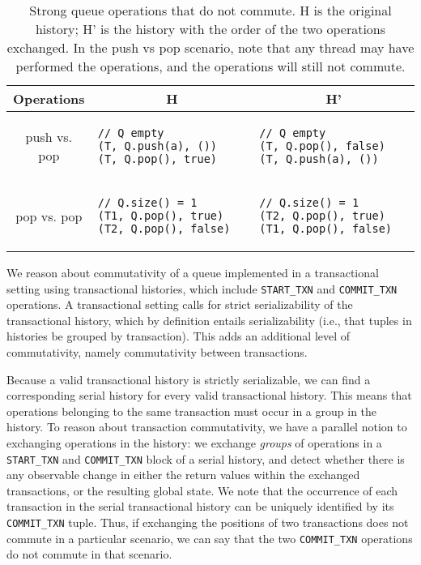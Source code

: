\begin{table}[t]
    \singlespace
    \centering
    \begin{tabular}{|c|l|l|}
        \hline
        Operations & \multicolumn{1}{c}{H} & \multicolumn{1}{|c|}{H'} \\
        \hline
    
        push vs. pop &
\begin{lstlisting}
// Q empty
(T, Q.push(a), ())                       
(T, Q.pop(), true)
\end{lstlisting} &
\begin{lstlisting}
// Q empty
(T, Q.pop(), false)
(T, Q.push(a), ())                       
\end{lstlisting}\\
\hline

    pop vs. pop &
\begin{lstlisting}
// Q.size() = 1
(T1, Q.pop(), true)
(T2, Q.pop(), false)                       
\end{lstlisting} &
\begin{lstlisting}
// Q.size() = 1
(T2, Q.pop(), true)
(T1, Q.pop(), false)                       
\end{lstlisting}\\
    \hline

    \end{tabular}
    \caption[Strong queue operations that do not commute]{Strong queue operations that do not commute. H is the original history; H' is the history with the order of the two operations exchanged. In the push vs pop scenario, note that any thread may have performed the operations, and the operations will still not commute.}
    \label{tab:strongq_commute}
    \end{table}

We reason about commutativity of a queue implemented in a transactional setting using transactional histories, which include \texttt{START\_TXN} and \texttt{COMMIT\_TXN} operations. A transactional setting calls for strict serializability of the transactional history, which by definition entails serializability (i.e., that tuples in histories be grouped by transaction). This adds an additional level of commutativity, namely commutativity between transactions.

Because a valid transactional history is strictly serializable, we can find a corresponding serial history for every valid transactional history. This means that operations belonging to the same transaction must occur in a group in the history. To reason about transaction commutativity, we have a parallel notion to exchanging operations in the history: we exchange \emph{groups} of operations in a \texttt{START\_TXN} and \texttt{COMMIT\_TXN} block of a serial history, and detect whether there is any observable change in either the return values within the exchanged transactions, or the resulting global state. We note that the occurrence of each transaction in the serial transactional history can be uniquely identified by its \texttt{COMMIT\_TXN} tuple. Thus, if exchanging the positions of two transactions does not commute in a particular scenario, we can say that the two \texttt{COMMIT\_TXN} operations do not commute in that scenario.

